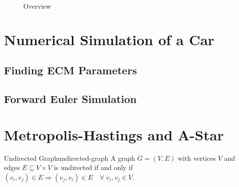 \documentclass{prettytex/ox/mmsc-special-topic}
\begin{document}
  \begin{figure}[H]
    \centering
    \caption{Overview}
    \label{fig:model-overview}
  \end{figure}

  \section{Numerical Simulation of a Car}
  \subsection{Finding ECM Parameters}
  \begin{figure}[H]
    \captionsetup[subfigure]{justification=centering}
    \centering
    \hfill
    \par
  \end{figure}

  \subsection{Forward Euler Simulation}

  \section{Metropolis-Hastings and A-Star}
  \begin{definition}{Undirected Graph}{undirected-graph}
    A graph $G = (V, E)$ with vertices $V$ and edges $E \subseteq V \times V$ is undirected if and only if $(v_i, v_j) \in E \Rightarrow (v_j, v_i) \in E \quad \forall\; v_i, v_j \in V$.
  \end{definition}
\end{document}
